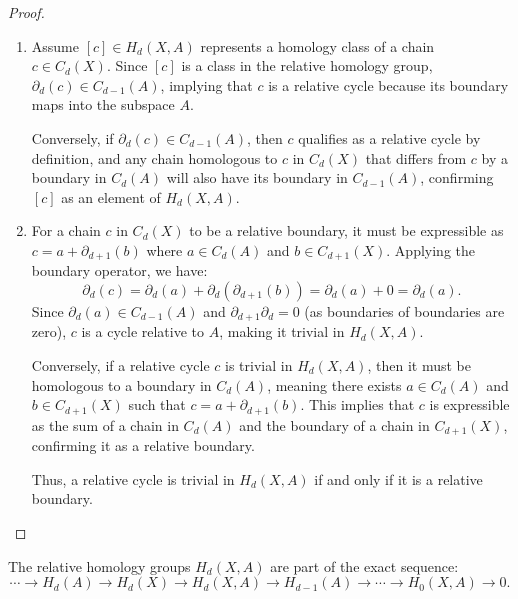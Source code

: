 \begin{proof}
\begin{enumerate}
    \item Assume $[c] \in H_d(X,A)$ represents a homology class of a chain $c \in C_d(X)$. Since $[c]$ is a class in the relative homology group, $\partial_d(c) \in C_{d-1}(A)$, implying that $c$ is a relative cycle because its boundary maps into the subspace $A$.

    Conversely, if $\partial_d(c) \in C_{d-1}(A)$, then $c$ qualifies as a relative cycle by definition, and any chain homologous to $c$ in $C_d(X)$ that differs from $c$ by a boundary in $C_d(A)$ will also have its boundary in $C_{d-1}(A)$, confirming $[c]$ as an element of $H_d(X,A)$.

    \item For a chain $c$ in $C_d(X)$ to be a relative boundary, it must be expressible as $c = a + \partial_{d+1}(b)$ where $a \in C_d(A)$ and $b \in C_{d+1}(X)$. Applying the boundary operator, we have:
    \[
    \partial_d(c) = \partial_d(a) + \partial_d(\partial_{d+1}(b)) = \partial_d(a) + 0 = \partial_d(a).
    \]
    Since $\partial_d(a) \in C_{d-1}(A)$ and $\partial_{d+1} \partial_d = 0$ (as boundaries of boundaries are zero), $c$ is a cycle relative to $A$, making it trivial in $H_d(X,A)$.

    Conversely, if a relative cycle $c$ is trivial in $H_d(X,A)$, then it must be homologous to a boundary in $C_d(A)$, meaning there exists $a \in C_d(A)$ and $b \in C_{d+1}(X)$ such that $c = a + \partial_{d+1}(b)$. This implies that $c$ is expressible as the sum of a chain in $C_d(A)$ and the boundary of a chain in $C_{d+1}(X)$, confirming it as a relative boundary.

    Thus, a relative cycle is trivial in $H_d(X,A)$ if and only if it is a relative boundary.
\end{enumerate}
\end{proof}

\begin{theorem}
The relative homology groups $H_d(X,A)$ are part of the exact sequence:
\begin{equation*}
\cdots \rightarrow H_d(A) \rightarrow H_d(X) \rightarrow H_d(X,A) \rightarrow H_{d-1}(A) \rightarrow \cdots \rightarrow H_0(X,A) \rightarrow 0.
\end{equation*}
\end{theorem}

